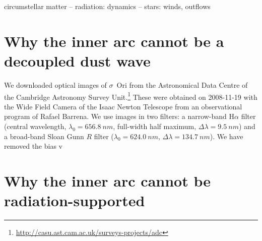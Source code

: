 \documentclass[useAMS, usenatbib, a4paper]{mnras}
\title
{\boldmath Bow shocks, bow waves, and dust waves. V. No dust wave for \(\sigma\) Ori}
\author[Henney \& Arthur]{
  William J. Henney \& S. Jane Arthur\\
  \AddressCRyA
}
\date{Accepted XXX. Received YYY; in original form ZZZ}
\newcommand\hii{\ion{H}{ii}}
\begin{document}
\label{firstpage}
\pagerange{\pageref{firstpage}--\pageref{lastpage}}
\maketitle
\begin{abstract}
  We critically evaluate the role of radiation and ram pressure in
  providing internal support for the bow-shaped infrared arc around
  the massive triple star system \(\sigma\)~Ori Aa/Ab/B in the IC434 \hii{}
  region.  We present evidence for hydrogen recombination line
  emission from the arc, which demonstrates that it cannot be a
  decoupled dust wave, as has previously been claimed.  On the other
  hand, we show that the fraction of the stellar luminosity trapped by
  the arc is insufficient for it to be supported by radiation if the
  grains and gas are well coupled.  Therefore, the arc must be
  supported by the ram pressure of an internal wind.  However, the
  stellar winds from the OB stars in the \(\sigma\)~Ori Aa/Ab/B system seem
  too weak to provide this support on their own.  We propose instead
  that it is the photoevaporated disk wind from the enclosed proplyd
  IRS~1B that dominates the ram pressure support for the bow.
\end{abstract}

\begin{keywords}
  circumstellar matter -- radiation: dynamics -- stars: winds, outflows
\end{keywords}

\section{Why the inner arc cannot be a decoupled dust wave}
\label{sec:why-not-dust}

We downloaded optical images of \(\sigma\)~Ori from the Astronomical Data
Centre of the Cambridge Astronomy Survey
Unit.\footnote{\url{http://casu.ast.cam.ac.uk/surveys-projects/adc}}
These were obtained on 2008-11-19 with the Wide Field Camera of the
Isaac Newton Telescope from an observational program of Rafael
Barrena.  We use images in two filters: a narrow-band H\(\alpha\) filter
(central wavelength, \(\lambda_0 = \SI{656.8}{nm}\), full-width half
maximum, \(\Delta\lambda = \SI{9.5}{nm}\)) and a broad-band Sloan Gunn
\(R\) filter (\(\lambda_0 = \SI{624.0}{nm}\), \(\Delta\lambda = \SI{134.7}{nm}\)).  We have removed the bias v

\section{Why the inner arc cannot be radiation-supported}
\label{sec:why-not-radiation}
\end{document}
